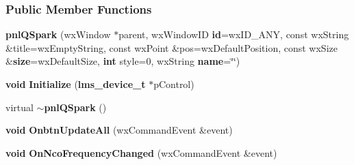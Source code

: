 \subsubsection*{Public Member Functions}
\begin{DoxyCompactItemize}
\item 
{\bf pnl\+Q\+Spark} (wx\+Window $\ast$parent, wx\+Window\+ID {\bf id}=wx\+I\+D\+\_\+\+A\+NY, const wx\+String \&title=wx\+Empty\+String, const wx\+Point \&pos=wx\+Default\+Position, const wx\+Size \&{\bf size}=wx\+Default\+Size, {\bf int} style=0, wx\+String {\bf name}=\char`\"{}\char`\"{})
\item 
{\bf void} {\bf Initialize} ({\bf lms\+\_\+device\+\_\+t} $\ast$p\+Control)
\item 
virtual {\bf $\sim$pnl\+Q\+Spark} ()
\item 
{\bf void} {\bf Onbtn\+Update\+All} (wx\+Command\+Event \&event)
\item 
{\bf void} {\bf On\+Nco\+Frequency\+Changed} (wx\+Command\+Event \&event)
\end{DoxyCompactItemize}
